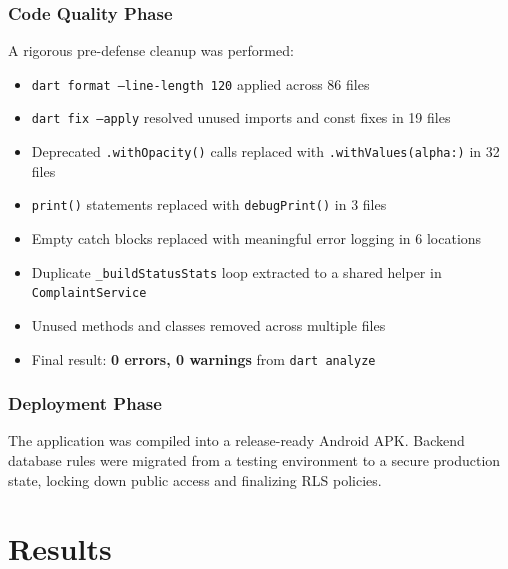 \documentclass[12pt, a4paper, twoside]{report}
\begin{document}
\subsection{Code Quality Phase}
A rigorous pre-defense cleanup was performed:
\begin{itemize}
    \item \texttt{dart format --line-length 120} applied across 86 files
    \item \texttt{dart fix --apply} resolved unused imports and const fixes in 19 files
    \item Deprecated \texttt{.withOpacity()} calls replaced with \texttt{.withValues(alpha:)} in 32 files
    \item \texttt{print()} statements replaced with \texttt{debugPrint()} in 3 files
    \item Empty catch blocks replaced with meaningful error logging in 6 locations
    \item Duplicate \texttt{\_buildStatusStats} loop extracted to a shared helper in \texttt{ComplaintService}
    \item Unused methods and classes removed across multiple files
    \item Final result: \textbf{0 errors, 0 warnings} from \texttt{dart analyze}
\end{itemize}

\subsection{Deployment Phase}
The application was compiled into a release-ready Android APK. Backend database rules were migrated from a testing environment to a secure production state, locking down public access and finalizing RLS policies.
\chapter{Results}
\end{document}
